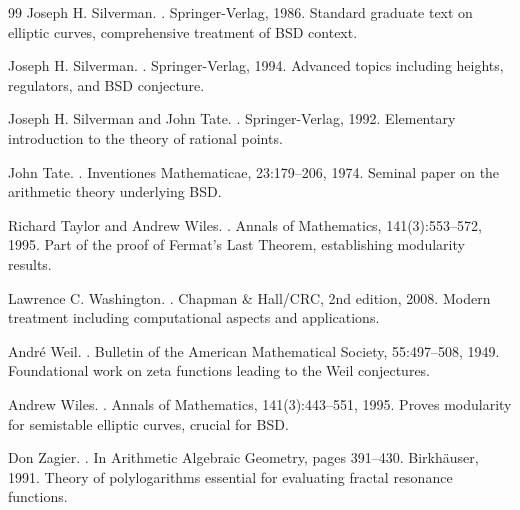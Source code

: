 \documentclass[12pt]{article}
\begin{document}
\begin{thebibliography}{99}
Joseph H. Silverman.
.
\newblock Springer-Verlag, 1986.
\newblock Standard graduate text on elliptic curves, comprehensive treatment of BSD context.

Joseph H. Silverman.
.
\newblock Springer-Verlag, 1994.
\newblock Advanced topics including heights, regulators, and BSD conjecture.

Joseph H. Silverman and John Tate.
.
\newblock Springer-Verlag, 1992.
\newblock Elementary introduction to the theory of rational points.

John Tate.
.
\newblock Inventiones Mathematicae, 23:179--206, 1974.
\newblock Seminal paper on the arithmetic theory underlying BSD.

Richard Taylor and Andrew Wiles.
.
\newblock Annals of Mathematics, 141(3):553--572, 1995.
\newblock Part of the proof of Fermat's Last Theorem, establishing modularity results.

Lawrence C. Washington.
.
\newblock Chapman \& Hall/CRC, 2nd edition, 2008.
\newblock Modern treatment including computational aspects and applications.

André Weil.
.
\newblock Bulletin of the American Mathematical Society, 55:497--508, 1949.
\newblock Foundational work on zeta functions leading to the Weil conjectures.

Andrew Wiles.
.
\newblock Annals of Mathematics, 141(3):443--551, 1995.
\newblock Proves modularity for semistable elliptic curves, crucial for BSD.

Don Zagier.
.
\newblock In Arithmetic Algebraic Geometry, pages 391--430. Birkhäuser, 1991.
\newblock Theory of polylogarithms essential for evaluating fractal resonance functions.

\end{thebibliography}
\end{document}
